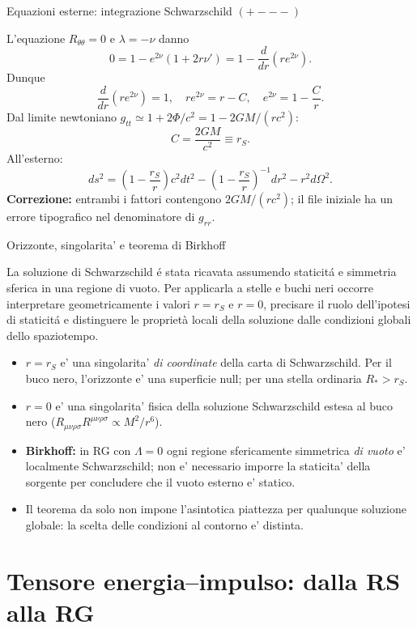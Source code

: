 \begin{frame}[t]{Equazioni esterne: integrazione Schwarzschild $(+---)$}\small\raggedright

L'equazione $R_{\theta\theta}=0$ e $\lambda=-\nu$ danno
\[
0=1-e^{2\nu}(1+2r\nu')
=1-\frac{d}{dr}\left(re^{2\nu}\right).
\]
Dunque
\[
\frac{d}{dr}\left(re^{2\nu}\right)=1,
\quad re^{2\nu}=r-C,
\quad e^{2\nu}=1-\frac Cr.
\]
Dal limite newtoniano $g_{tt}\simeq1+2\Phi/c^2=1-2GM/(rc^2)$:
\[
C=\frac{2GM}{c^2}\equiv r_S.
\]
All'esterno:
\[
\boxed{ds^2=\left(1-\frac{r_S}{r}\right)c^2dt^2-
\left(1-\frac{r_S}{r}\right)^{-1}dr^2-r^2d\Omega^2.}
\]
\textbf{Correzione:} entrambi i fattori contengono $2GM/(rc^2)$; il file iniziale ha un errore tipografico nel denominatore di $g_{rr}$.

\end{frame}

\begin{frame}[t]{Orizzonte, singolarita' e teorema di Birkhoff}\small\raggedright
La soluzione di Schwarzschild \'e stata ricavata assumendo staticit\'a e simmetria sferica in una regione di vuoto. Per applicarla a stelle e buchi neri occorre interpretare geometricamente i valori \(r=r_S\) e \(r=0\), precisare il ruolo dell'ipotesi di staticit\'a e distinguere le proprietà locali della soluzione dalle condizioni globali dello spaziotempo.
\begin{itemize}
\item $r=r_S$ e' una singolarita' \emph{di coordinate} della carta di Schwarzschild. Per il buco nero, l'orizzonte e' una superficie null; per una stella ordinaria $R_*>r_S$.
\item $r=0$ e' una singolarita' fisica della soluzione Schwarzschild estesa al buco nero ($R_{\mu\nu\rho\sigma}R^{\mu\nu\rho\sigma}\propto M^2/r^6$).
\item \textbf{Birkhoff:} in RG con $\Lambda=0$ ogni regione sfericamente simmetrica \emph{di vuoto} e' localmente Schwarzschild; non e' necessario imporre la staticita' della sorgente per concludere che il vuoto esterno e' statico.
\item Il teorema da solo non impone l'asintotica piattezza per qualunque soluzione globale: la scelta delle condizioni al contorno e' distinta.
\end{itemize}

\end{frame}

\section{Tensore energia--impulso: dalla RS alla RG}

